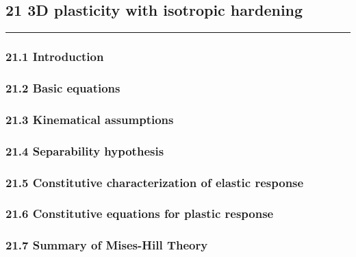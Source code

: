 \hypertarget{d-plasticity-with-isotropic-hardening}{%
\subsection{21 3D plasticity with isotropic
hardening}\label{d-plasticity-with-isotropic-hardening}}

\begin{center}\rule{0.5\linewidth}{0.5pt}\end{center}

\hypertarget{introduction}{%
\subsubsection{21.1 Introduction}\label{introduction}}

\hypertarget{basic-equations}{%
\subsubsection{21.2 Basic equations}\label{basic-equations}}

\hypertarget{kinematical-assumptions}{%
\subsubsection{21.3 Kinematical
assumptions}\label{kinematical-assumptions}}

\hypertarget{separability-hypothesis}{%
\subsubsection{21.4 Separability
hypothesis}\label{separability-hypothesis}}

\hypertarget{constitutive-characterization-of-elastic-response}{%
\subsubsection{21.5 Constitutive characterization of elastic
response}\label{constitutive-characterization-of-elastic-response}}

\hypertarget{constitutive-equations-for-plastic-response}{%
\subsubsection{21.6 Constitutive equations for plastic
response}\label{constitutive-equations-for-plastic-response}}

\hypertarget{summary-of-mises-hill-theory}{%
\subsubsection{21.7 Summary of Mises-Hill
Theory}\label{summary-of-mises-hill-theory}}

